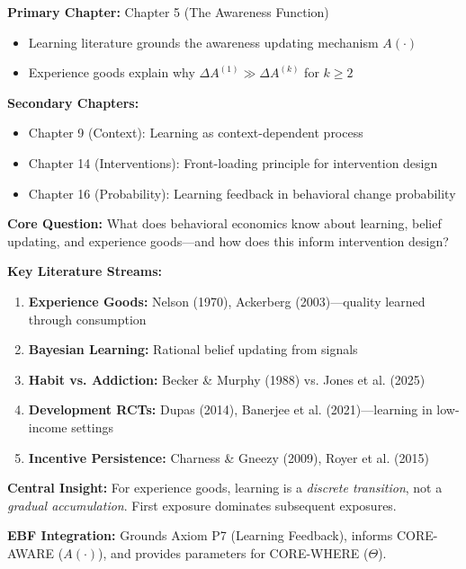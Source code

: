 \documentclass[11pt, a4paper]{article}
\begin{document}

\begin{tcolorbox}[colback=blue!5!white, colframe=blue!75!black, title=Chapter Linkage]
\textbf{Primary Chapter:} Chapter 5 (The Awareness Function)
\begin{itemize}[nosep]
    \item Learning literature grounds the awareness updating mechanism $A(\cdot)$
    \item Experience goods explain why $\Delta A^{(1)} \gg \Delta A^{(k)}$ for $k \geq 2$
\end{itemize}

\textbf{Secondary Chapters:}
\begin{itemize}[nosep]
    \item Chapter 9 (Context): Learning as context-dependent process
    \item Chapter 14 (Interventions): Front-loading principle for intervention design
    \item Chapter 16 (Probability): Learning feedback in behavioral change probability
\end{itemize}
\end{tcolorbox}


\begin{tcolorbox}[colback=yellow!5!white, colframe=yellow!75!black, title=Quick Reference]
\textbf{Core Question:} What does behavioral economics know about learning, belief updating, and experience goods---and how does this inform intervention design?

\textbf{Key Literature Streams:}
\begin{enumerate}[nosep]
    \item \textbf{Experience Goods:} Nelson (1970), Ackerberg (2003)---quality learned through consumption
    \item \textbf{Bayesian Learning:} Rational belief updating from signals
    \item \textbf{Habit vs. Addiction:} Becker \& Murphy (1988) vs. Jones et al. (2025)
    \item \textbf{Development RCTs:} Dupas (2014), Banerjee et al. (2021)---learning in low-income settings
    \item \textbf{Incentive Persistence:} Charness \& Gneezy (2009), Royer et al. (2015)
\end{enumerate}

\textbf{Central Insight:} For experience goods, learning is a \textit{discrete transition}, not a \textit{gradual accumulation}. First exposure dominates subsequent exposures.

\textbf{EBF Integration:} Grounds Axiom P7 (Learning Feedback), informs CORE-AWARE ($A(\cdot)$), and provides parameters for CORE-WHERE ($\Theta$).
\end{tcolorbox}
\end{document}
